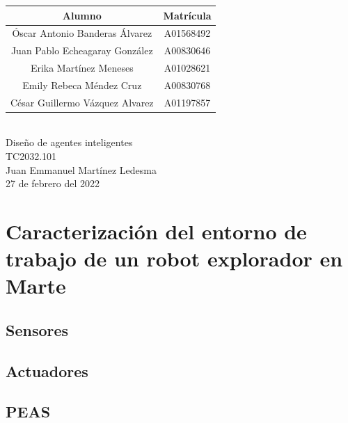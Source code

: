 \documentclass{article}
\begin{document}
\begin{titlepage}
\begin{center}
        \begin{tabular}{|| c | c ||}
            \hline
            Alumno & Matrícula \\
            \hline
            Óscar Antonio Banderas Álvarez  & A01568492 \\
            \hline
            Juan Pablo Echeagaray González & A00830646 \\
            \hline
            Erika Martínez Meneses & A01028621 \\
            \hline
            Emily Rebeca Méndez Cruz & A00830768 \\
            \hline
            César Guillermo Vázquez Alvarez & A01197857 \\
            \hline
        \end{tabular} \\
        \vspace{0.7cm}
        Diseño de agentes inteligentes\\ %
        \vspace{0.2cm}
        TC2032.101\\ %
        \vspace{0.2cm}
        Juan Emmanuel Martínez Ledesma \\ %
        \vspace{0.7cm}
        27 de febrero del 2022 \\ %
        \end{center}
    \end{titlepage}

    \section{Caracterización del entorno de trabajo de un robot explorador en Marte}
        \subsection{Sensores}

        \subsection{Actuadores}

        \subsection{PEAS}
\end{document}
